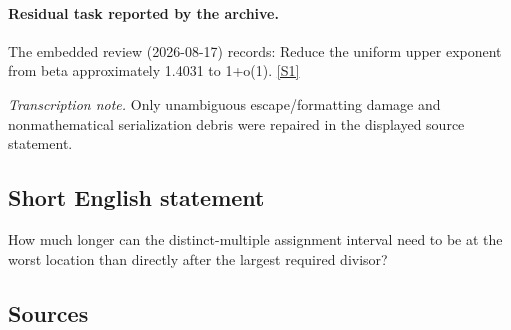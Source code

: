 \documentclass[11pt,a4paper]{article}
\newcommand{\sref}[2]{\hyperlink{source:#1:#2}{[S#2]}}
\begin{document}
\paragraph{Residual task reported by the archive.}

The embedded review (2026-08-17) records: Reduce the uniform upper exponent from beta approximately 1.4031 to 1+o(1). \sref{2274}{1}

{\small\emph{Transcription note.} Only unambiguous escape/formatting damage and nonmathematical serialization debris were repaired in the displayed source statement.}

\subsection{Short English statement}

How much longer can the distinct-multiple assignment interval need to be at the worst location than directly after the largest required divisor?

\subsection{Sources}
\end{document}
